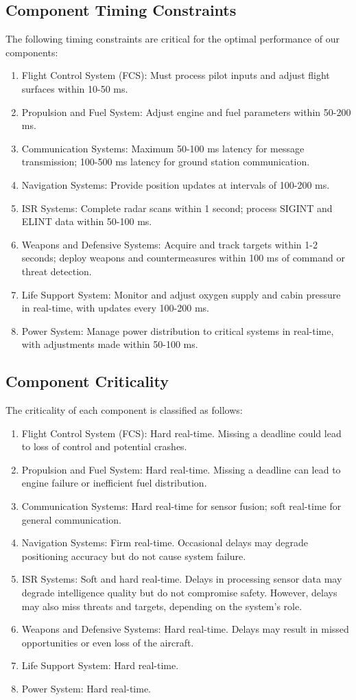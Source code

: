\subsection{Component Timing Constraints}
The following timing constraints are critical for the optimal performance of our components:
\begin{enumerate}[label=T\arabic*)]
	\item Flight Control System (FCS): Must process pilot inputs and adjust flight surfaces within 10-50 ms.
	\item Propulsion and Fuel System: Adjust engine and fuel parameters within 50-200 ms.
	\item Communication Systems: Maximum 50-100 ms latency for message transmission; 100-500 ms latency for ground station communication.
	\item Navigation Systems: Provide position updates at intervals of 100-200 ms.
	\item ISR Systems: Complete radar scans within 1 second; process SIGINT and ELINT data within 50-100 ms.
	\item Weapons and Defensive Systems: Acquire and track targets within 1-2 seconds; deploy weapons and countermeasures within 100 ms of command or threat detection.
	\item Life Support System: Monitor and adjust oxygen supply and cabin pressure in real-time, with updates every 100-200 ms.
	\item Power System: Manage power distribution to critical systems in real-time, with adjustments made within 50-100 ms.
\end{enumerate}

\subsection{Component Criticality}
The criticality of each component is classified as follows:
\begin{enumerate}[label=C\arabic*)]
	\item Flight Control System (FCS): Hard real-time. Missing a deadline could lead to loss of control and potential crashes.
	\item Propulsion and Fuel System: Hard real-time. Missing a deadline can lead to engine failure or inefficient fuel distribution.
	\item Communication Systems: Hard real-time for sensor fusion; soft real-time for general communication.
	\item Navigation Systems: Firm real-time. Occasional delays may degrade positioning accuracy but do not cause system failure.
	\item ISR Systems: Soft and hard real-time. Delays in processing sensor data may degrade intelligence quality but do not compromise safety. However, delays may also miss threats and targets, depending on the system's role.
	\item Weapons and Defensive Systems: Hard real-time. Delays may result in missed opportunities or even loss of the aircraft.
	\item Life Support System: Hard real-time.
	\item Power System: Hard real-time.
\end{enumerate}

